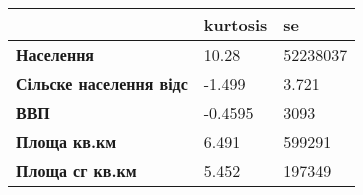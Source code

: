 \documentclass[
]{article}
\begin{document}
\begin{longtable}[]{@{}lll@{}}
\toprule
\begin{minipage}[b]{0.20\columnwidth}\raggedright
~\strut
\end{minipage} & \begin{minipage}[b]{0.14\columnwidth}\raggedright
kurtosis\strut
\end{minipage} & \begin{minipage}[b]{0.14\columnwidth}\raggedright
se\strut
\end{minipage}\tabularnewline
\midrule
\endhead
\begin{minipage}[t]{0.20\columnwidth}\raggedright
\textbf{Населення}\strut
\end{minipage} & \begin{minipage}[t]{0.14\columnwidth}\raggedright
10.28\strut
\end{minipage} & \begin{minipage}[t]{0.14\columnwidth}\raggedright
52238037\strut
\end{minipage}\tabularnewline
\begin{minipage}[t]{0.20\columnwidth}\raggedright
\textbf{Сільске населення відс}\strut
\end{minipage} & \begin{minipage}[t]{0.14\columnwidth}\raggedright
-1.499\strut
\end{minipage} & \begin{minipage}[t]{0.14\columnwidth}\raggedright
3.721\strut
\end{minipage}\tabularnewline
\begin{minipage}[t]{0.20\columnwidth}\raggedright
\textbf{ВВП}\strut
\end{minipage} & \begin{minipage}[t]{0.14\columnwidth}\raggedright
-0.4595\strut
\end{minipage} & \begin{minipage}[t]{0.14\columnwidth}\raggedright
3093\strut
\end{minipage}\tabularnewline
\begin{minipage}[t]{0.20\columnwidth}\raggedright
\textbf{Площа кв.км}\strut
\end{minipage} & \begin{minipage}[t]{0.14\columnwidth}\raggedright
6.491\strut
\end{minipage} & \begin{minipage}[t]{0.14\columnwidth}\raggedright
599291\strut
\end{minipage}\tabularnewline
\begin{minipage}[t]{0.20\columnwidth}\raggedright
\textbf{Площа сг кв.км}\strut
\end{minipage} & \begin{minipage}[t]{0.14\columnwidth}\raggedright
5.452\strut
\end{minipage} & \begin{minipage}[t]{0.14\columnwidth}\raggedright
197349\strut
\end{minipage}\tabularnewline
\bottomrule
\end{longtable}
\end{document}
